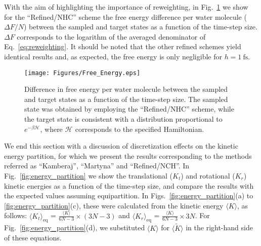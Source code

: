 \documentclass[
	aip,
	jcp,
	reprint,
]{revtex4-1}
\newcommand{\Ham}[1]{{\mathcal H}_\text{#1}}           %
\newcommand{\refined}[1]{\widetilde{#1}}
\begin{document}
With the aim of highlighting the importance of reweighting, in Fig.~\ref{fig:free_energy} we show for the ``Refined/NHC'' scheme the free energy difference per water molecule ($\Delta F/N$) between the sampled and target states as a function of the time-step size.
$\Delta F$ corresponds to the logarithm of the averaged denominator of Eq.~\eqref{eq:reweighting}.
It should be noted that the other refined schemes yield identical results and, as expected, the free energy is only negligible for $h = 1~\text{fs}$.

\begin{figure}
	\texttt{[image: Figures/Free\_Energy.eps]}
	\caption{Difference in free energy per water molecule between the sampled and target states as a function of the time-step size. The sampled state was obtained by employing the ``Refined/NHC'' scheme, while the target state is consistent with a distribution proportional to $e^{-\beta \Ham{}}$, where $\Ham{}$ corresponds to the specified Hamiltonian.}
	\label{fig:free_energy}
\end{figure}

We end this section with a discussion of discretization effects on the kinetic energy partition, for which we present the results corresponding to the methods referred as ``Kamberaj'', ``Martyna'' and ``Refined/NCH''.
In Fig.~\ref{fig:energy_partition} we show the translational ($K_t$) and rotational ($K_r$) kinetic energies as a function of the time-step size, and compare the results with the expected values assuming equipartition.
In Figs.~\ref{fig:energy_partition}(a) to \ref{fig:energy_partition}(c), these were calculated from the kinetic energy $\langle K \rangle$, as follows: $\langle K_t \rangle_\text{eq}$ = $\frac{\langle K \rangle}{6N-3} \times (3N-3)$ and $\langle K_r \rangle_\text{eq}$ = $\frac{\langle K \rangle}{6N-3} \times 3N$.
For Fig.~\ref{fig:energy_partition}(d), we substituted $\langle K \rangle$ for $\langle \refined{K} \rangle$ in the right-hand side of these equations.
\end{document}
